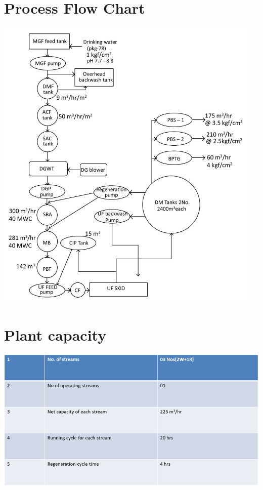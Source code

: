 \documentclass[english,11pt]{report}
\begin{document}
\section{Process Flow Chart}
\includegraphics[width = 5in]{dmprocess.jpg}
\section{Plant capacity}
\includegraphics[width = 6in]{dm1.png}
\end{document}
